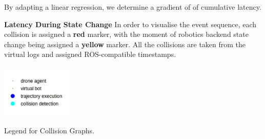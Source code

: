 By adapting a linear regression, we determine a gradient of  of cumulative latency. 

\textbf{Latency During State Change     } In order to visualise the event sequence, each collision is assigned a \textbf{red} marker, with the moment of robotics backend state change being assigned a \textbf{yellow} marker. All the collisions are taken from the virtual logs and assigned ROS-compatible timestamps. 


\begin{marginfigure}%
  \vspace{3.5cm}\hspace{0.5cm}
  \includegraphics[width=3.5cm]{images/hdi_graphs/timelineview_legend.png}
   \caption{Legend for Collision Graphs.}
  \label{fig:legend_collisions}
\end{marginfigure}

